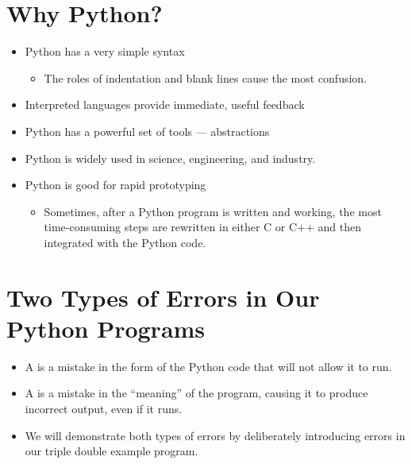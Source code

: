 \documentclass[letterpaper,10pt,english]{sphinxmanual}
\begin{document}
\section{Why Python?}
\label{\detokenize{lecture_notes/lec01_intro:why-python}}\begin{itemize}
\item {} 
Python has a very simple syntax
\begin{itemize}
\item {} 
The roles of indentation and blank lines cause the most confusion.

\end{itemize}

\item {} 
Interpreted languages provide immediate, useful feedback

\item {} 
Python has a powerful set of tools — abstractions

\item {} 
Python is widely used in science, engineering, and industry.

\item {} 
Python is good for rapid prototyping
\begin{itemize}
\item {} 
Sometimes, after a Python program is written and working, the
most time-consuming steps are rewritten in either C or C++ and
then integrated with the Python code.

\end{itemize}

\end{itemize}


\section{Two Types of Errors in Our Python Programs}
\label{\detokenize{lecture_notes/lec01_intro:two-types-of-errors-in-our-python-programs}}\begin{itemize}
\item {} 
A  is a mistake in the form of the Python code that
will not allow it to run.

\item {} 
A  is a mistake in the “meaning” of the program,
causing it to produce incorrect output, even if it runs.

\item {} 
We will demonstrate both types of errors by deliberately introducing
errors in our triple double example program.

\end{itemize}
\end{document}

